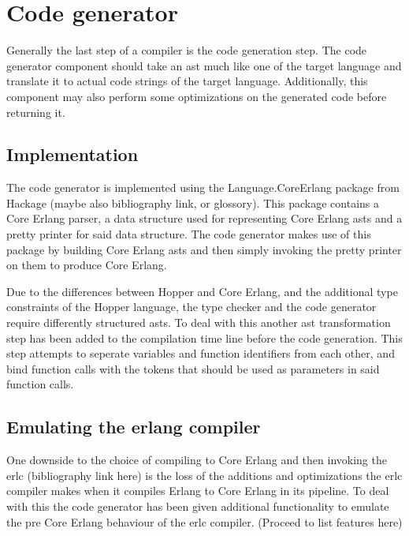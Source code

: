 \section{Code generator}


Generally the last step of a compiler is the code generation step. The code generator
component should take an \gls{ast} much like one of the target language and translate it
to actual code strings of the target language. Additionally, this component may also
perform some optimizations on the generated code before returning it.

\subsection{Implementation}

The code generator is implemented using the Language.CoreErlang \cite{CoreErlang} package
from Hackage (maybe also bibliography link, or glossory). This package contains a Core Erlang
parser, a data structure used for representing Core Erlang \gls{ast}s and a pretty printer for
said data structure. The code generator makes use of this package by building Core Erlang
\gls{ast}s and then simply invoking the pretty printer on them to  produce Core Erlang.

Due to the differences between Hopper and Core Erlang, and the additional type constraints
of the Hopper language, the type checker and the code generator require differently
structured \gls{ast}s. To deal with this another \gls{ast} transformation step has been added
to the compilation time line before the code generation. This step attempts to seperate variables
and function identifiers from each other, and bind function calls with the tokens that
should be used as parameters in said function calls.



\subsection{Emulating the erlang compiler}

One downside to the choice of compiling to Core Erlang and then invoking the erlc
(bibliography link here) is the loss of the additions and optimizations the erlc
compiler makes when it compiles Erlang to Core Erlang in its pipeline. To deal with this
the code generator has been given additional functionality to emulate the pre Core Erlang
behaviour of the erlc compiler. (Proceed to list features here)